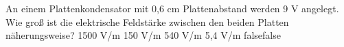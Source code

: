     {An einem Plattenkondensator mit 0,6 cm Plattenabstand werden 9 V angelegt. Wie groß ist die elektrische Feldstärke zwischen den beiden Platten näherungsweise?}
    {1500 V/m}
    {150 V/m}
    {540 V/m}
    {5,4 V/m}
    {false}{false}
